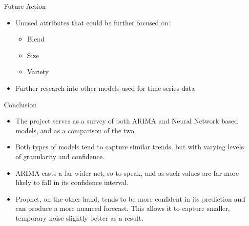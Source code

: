 \documentclass[9pt, dvipsnames]{beamer}
\begin{document}
    \begin{frame}{Future Action}
        \begin{itemize}
            \item Unused attributes that could be further focused on:
                \begin{itemize}
                    \item Blend
                    \item Size
                    \item Variety \pause
                \end{itemize}
            \item Further research into other models used for time-series data
        \end{itemize}
    \end{frame}
    \begin{frame}{Conclusion}
        \begin{itemize}
            \item The project serves as a survey of both ARIMA and Neural Network based models, and as a 
            comparison of the two. \pause
            \item Both types of models tend to capture similar trends, but with varying levels of granularity 
            and confidence. \pause
            \item ARIMA casts a far wider net, so to speak, and as such values are far more likely to fall in 
            its confidence interval. \pause
            \item Prophet, on the other hand, tends to be more confident in its prediction and can produce a 
            more nuanced forecast. This allows it to capture smaller, temporary noise slightly better as a 
            result.
        \end{itemize}
    \end{frame}
\end{document}
